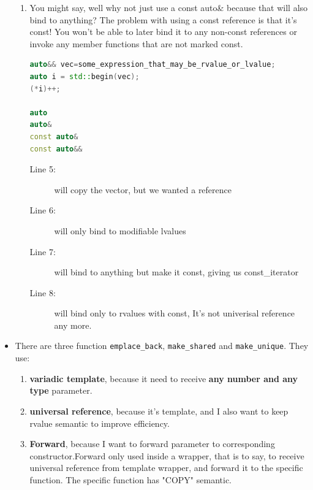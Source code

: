 \documentclass[a4paper,11pt,twoside]{book}
\begin{document}
\begin{itemize}
\begin{enumerate}
		\item You might say, well why not just use a const auto\& because that will also bind to anything? The problem with using a const reference is that it's const! You won't be able to later bind it to any non-const references or invoke any member functions that are not marked const.
\begin{lstlisting}[frame=single, language=c++]
auto&& vec=some_expression_that_may_be_rvalue_or_lvalue;
auto i = std::begin(vec);
(*i)++;

auto         
auto&       
const auto&
const auto&& 
\end{lstlisting} 
\begin{description}
	\item[Line 5:] will copy the vector, but we wanted a reference
	\item[Line 6:] will only bind to modifiable lvalues
	\item[Line 7:] will bind to anything but make it const, giving us const\_iterator
	\item[Line 8:] will bind only to rvalues with const, It's not univerisal reference any more.
\end{description}
	\end{enumerate}

\item There are three function \texttt{emplace\_back}, \texttt{make\_shared} and \texttt{make\_unique}. They use:
	\begin{enumerate}
		\item \textbf{variadic template}, because it need to receive \textbf{any number and any type} parameter.

		\item \textbf{universal reference}, because it's template, and I also want to keep rvalue semantic to improve efficiency. 
		
		\item \textbf{Forward}, because I want to forward parameter to corresponding constructor.Forward only used inside a wrapper, that is to say, to receive universal reference from template wrapper, and forward it to the specific function. The specific function has "COPY" semantic. 
	\end{enumerate}
\end{itemize}
\end{document}

